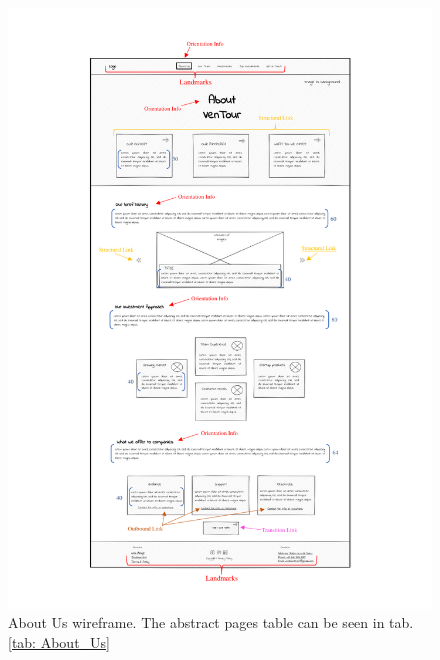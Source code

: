 \begin{figure}
    \centering
    \includegraphics[width=\textwidth]{Images/Wireframes/About us_wireframe.pdf}
    \caption{About Us wireframe. The abstract pages table can be seen in tab. \ref{tab: About_Us}}
    \label{fig: AboutUsWireframe}
\end{figure}

